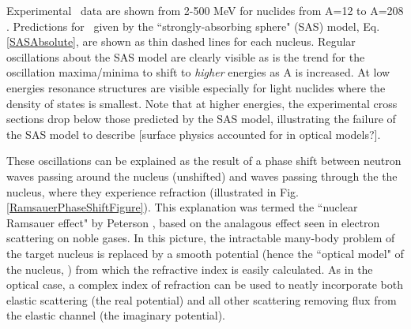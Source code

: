 Experimental \tot\ data are shown from 2-500
MeV for nuclides from A=12 to A=208
\cite{Finlay1993, Schwartz1974, Poenitz1983, Abfalterer2000, Abfalterer2001}.
Predictions for \tot\ given by the ``strongly-absorbing sphere" (SAS)
model, Eq. \ref{SASAbsolute}, are shown as thin dashed lines for each nucleus.
Regular oscillations about the SAS model are clearly visible
as is the trend for the oscillation
maxima/minima to shift to \textit{higher} energies as A is increased. At low energies 
resonance structures are visible especially for light nuclides where the
density of states is smallest. Note that at higher energies, the experimental
cross sections drop below those predicted by the SAS model, illustrating
the failure of the SAS model to describe [surface physics accounted for in
optical models?].

These oscillations can be explained as the result of a phase shift between 
neutron waves passing around the nucleus (unshifted) and waves passing
through the the nucleus, where they experience refraction
(illustrated in Fig. \ref{RamsauerPhaseShiftFigure}). This explanation was termed the ``nuclear 
Ramsauer effect" by Peterson \cite{Peterson1962}, based on the analagous effect seen in 
electron scattering on noble gases.
In this picture, the intractable many-body
problem of the target nucleus is replaced by a smooth potential (hence the
``optical model" of the nucleus, \cite{Feshbach1958}) from which the refractive
index is easily calculated. As in the optical case, a complex index of
refraction can be used to neatly incorporate both elastic scattering (the real
potential) and all other scattering removing flux from the elastic channel (the imaginary potential).

